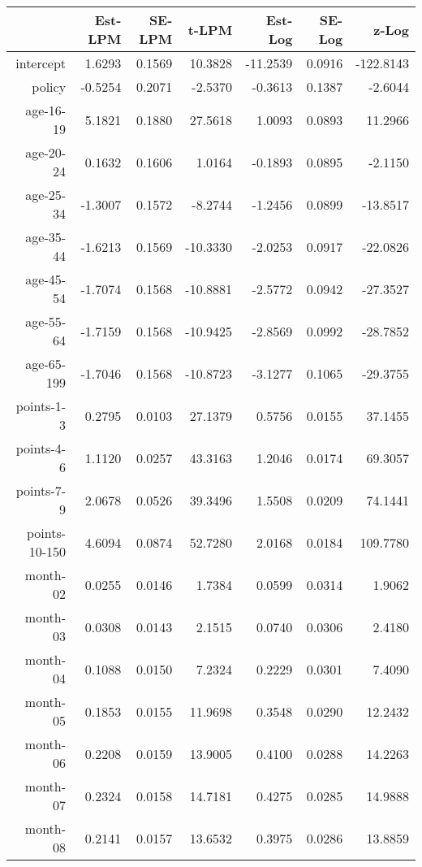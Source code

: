 \documentclass[10pt]{article}
\begin{document}

\begin{table}[ht]
\centering
\begin{tabular}{rrrrrrr}
  \hline
 & Est-LPM & SE-LPM & t-LPM & Est-Log & SE-Log & z-Log \\ 
  \hline
intercept & 1.6293 & 0.1569 & 10.3828 & -11.2539 & 0.0916 & -122.8143 \\ 
  policy & -0.5254 & 0.2071 & -2.5370 & -0.3613 & 0.1387 & -2.6044 \\ 
  age-16-19 & 5.1821 & 0.1880 & 27.5618 & 1.0093 & 0.0893 & 11.2966 \\ 
  age-20-24 & 0.1632 & 0.1606 & 1.0164 & -0.1893 & 0.0895 & -2.1150 \\ 
  age-25-34 & -1.3007 & 0.1572 & -8.2744 & -1.2456 & 0.0899 & -13.8517 \\ 
  age-35-44 & -1.6213 & 0.1569 & -10.3330 & -2.0253 & 0.0917 & -22.0826 \\ 
  age-45-54 & -1.7074 & 0.1568 & -10.8881 & -2.5772 & 0.0942 & -27.3527 \\ 
  age-55-64 & -1.7159 & 0.1568 & -10.9425 & -2.8569 & 0.0992 & -28.7852 \\ 
  age-65-199 & -1.7046 & 0.1568 & -10.8723 & -3.1277 & 0.1065 & -29.3755 \\ 
  points-1-3 & 0.2795 & 0.0103 & 27.1379 & 0.5756 & 0.0155 & 37.1455 \\ 
  points-4-6 & 1.1120 & 0.0257 & 43.3163 & 1.2046 & 0.0174 & 69.3057 \\ 
  points-7-9 & 2.0678 & 0.0526 & 39.3496 & 1.5508 & 0.0209 & 74.1441 \\ 
  points-10-150 & 4.6094 & 0.0874 & 52.7280 & 2.0168 & 0.0184 & 109.7780 \\ 
  month-02 & 0.0255 & 0.0146 & 1.7384 & 0.0599 & 0.0314 & 1.9062 \\ 
  month-03 & 0.0308 & 0.0143 & 2.1515 & 0.0740 & 0.0306 & 2.4180 \\ 
  month-04 & 0.1088 & 0.0150 & 7.2324 & 0.2229 & 0.0301 & 7.4090 \\ 
  month-05 & 0.1853 & 0.0155 & 11.9698 & 0.3548 & 0.0290 & 12.2432 \\ 
  month-06 & 0.2208 & 0.0159 & 13.9005 & 0.4100 & 0.0288 & 14.2263 \\ 
  month-07 & 0.2324 & 0.0158 & 14.7181 & 0.4275 & 0.0285 & 14.9888 \\ 
  month-08 & 0.2141 & 0.0157 & 13.6532 & 0.3975 & 0.0286 & 13.8859 \\ 

\end{tabular}
\end{table}
\end{document}
